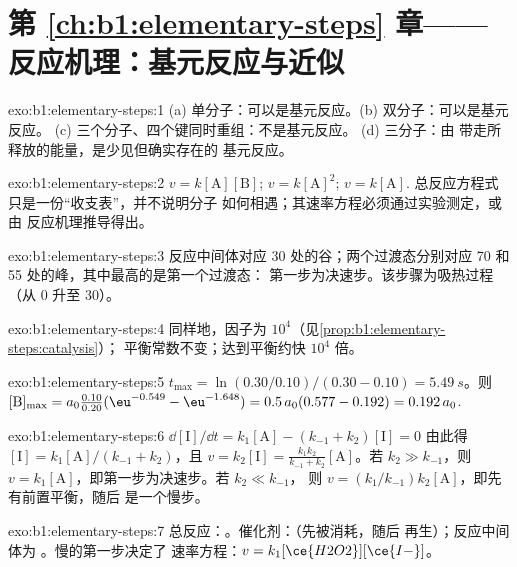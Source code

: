 \section*{第 \ref{ch:b1:elementary-steps} 章——反应机理：基元反应与近似}

\begin{solution}{exo:b1:elementary-steps:1}
(a) 单分子：可以是基元反应。(b) 双分子：可以是基元反应。
(c) 三个分子、四个键同时重组：不是基元反应。
(d) 三分子：由  带走所释放的能量，是少见但确实存在的
基元反应。
\end{solution}

\begin{solution}{exo:b1:elementary-steps:2}
$v = k[\mathrm{A}][\mathrm{B}]$; $v = k[\mathrm{A}]^2$; $v = k[\mathrm{A}]$.
总反应方程式只是一份“收支表”，并不说明分子
如何相遇；其速率方程必须通过实验测定，或由
反应机理推导得出。
\end{solution}

\begin{solution}{exo:b1:elementary-steps:3}
反应中间体对应 30 处的谷；两个过渡态分别对应
70 和 55 处的峰，其中最高的是第一个过渡态：
第一步为决速步。该步骤为吸热过程（从 0 升至 30）。
\end{solution}

\begin{solution}{exo:b1:elementary-steps:4}
同样地，因子为 $10^4$（见\cref{prop:b1:elementary-steps:catalysis}）；
平衡常数不变；达到平衡约快
$10^4$ 倍。
\end{solution}

\begin{solution}{exo:b1:elementary-steps:5}
$t_{\max} = \ln(0.30/0.10)/(0.30 - 0.10) = \qty{5.49}{s}$。则
$[\mathrm{B}]_{\max} = a_0\frac{0.10}{0.20}(\eu^{-0.549} - \eu^{-1.648}) =
0.5\,a_0(0.577 - 0.192) = 0.192\,a_0$.
\end{solution}

\begin{solution}{exo:b1:elementary-steps:6}
$\dd[\mathrm{I}]/\dd t = k_1[\mathrm{A}] - (k_{-1} + k_2)[\mathrm{I}] = 0$
由此得 $[\mathrm{I}] = k_1[\mathrm{A}]/(k_{-1} + k_2)$，且 $v = k_2[\mathrm{I}]
= \frac{k_1k_2}{k_{-1}+k_2}[\mathrm{A}]$。若 $k_2 \gg k_{-1}$，则 $v =
k_1[\mathrm{A}]$，即第一步为决速步。若 $k_2 \ll k_{-1}$，
则 $v = (k_1/k_{-1})k_2[\mathrm{A}]$，即先有前置平衡，随后
是一个慢步。
\end{solution}

\begin{solution}{exo:b1:elementary-steps:7}
总反应：。催化剂：（先被消耗，随后
再生）；反应中间体为 。慢的第一步决定了
速率方程：$v = k_1[\ce{H2O2}][\ce{I-}]$。
\end{solution}

